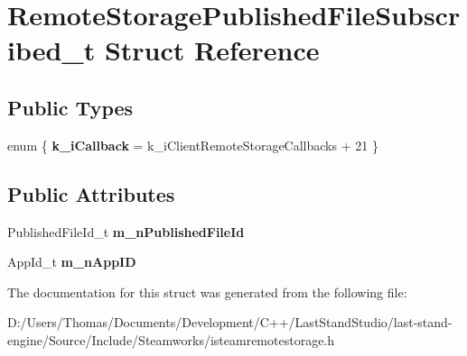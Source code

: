 \hypertarget{structRemoteStoragePublishedFileSubscribed__t}{}\section{Remote\+Storage\+Published\+File\+Subscribed\+\_\+t Struct Reference}
\label{structRemoteStoragePublishedFileSubscribed__t}
\subsection*{Public Types}
\begin{DoxyCompactItemize}
\item 
\hypertarget{structRemoteStoragePublishedFileSubscribed__t_a7a5255ba0b26be7a9e3f41cd8ce0885e}{}enum \{ {\bfseries k\+\_\+i\+Callback} = k\+\_\+i\+Client\+Remote\+Storage\+Callbacks + 21
 \}\label{structRemoteStoragePublishedFileSubscribed__t_a7a5255ba0b26be7a9e3f41cd8ce0885e}

\end{DoxyCompactItemize}
\subsection*{Public Attributes}
\begin{DoxyCompactItemize}
\item 
\hypertarget{structRemoteStoragePublishedFileSubscribed__t_a8746e1ea3dcf44e58bc44d4b1b4802f4}{}Published\+File\+Id\+\_\+t {\bfseries m\+\_\+n\+Published\+File\+Id}\label{structRemoteStoragePublishedFileSubscribed__t_a8746e1ea3dcf44e58bc44d4b1b4802f4}

\item 
\hypertarget{structRemoteStoragePublishedFileSubscribed__t_a61b31398ce212c4a65758ec1799619aa}{}App\+Id\+\_\+t {\bfseries m\+\_\+n\+App\+I\+D}\label{structRemoteStoragePublishedFileSubscribed__t_a61b31398ce212c4a65758ec1799619aa}

\end{DoxyCompactItemize}


The documentation for this struct was generated from the following file\+:\begin{DoxyCompactItemize}
\item 
D\+:/\+Users/\+Thomas/\+Documents/\+Development/\+C++/\+Last\+Stand\+Studio/last-\/stand-\/engine/\+Source/\+Include/\+Steamworks/isteamremotestorage.\+h\end{DoxyCompactItemize}

